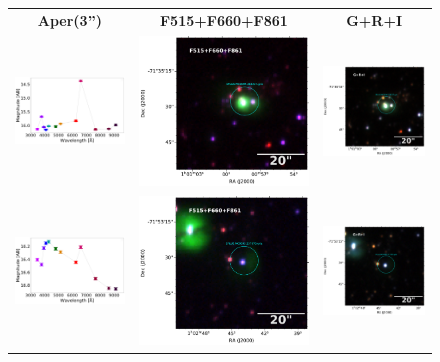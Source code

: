 \documentclass[11pt]{article}
\begin{document}
\newpage
\begin{figure}[!h]
\centering
\begin{tabular}{ccc}
\textbf{Aper(3'')} & \textbf{F515+F660+F861} & \textbf{G+R+I} \\
\includegraphics[width=0.3\linewidth, clip]{photopectrum_splus_MC0094-318227_compat-HIIRegions-smc-match-splus_aper.pdf} & \includegraphics[width=0.3\linewidth, clip]{MC0094/MC0094_F861_318227-RGB-hii.pdf} & \includegraphics[width=0.3\linewidth, clip]{MC0094/MC0094_I_318227-RGB-hii.pdf} \\
\includegraphics[width=0.3\linewidth, clip]{photopectrum_splus_MC0095-257970_compat-HIIRegions-smc-match-splus_aper.pdf} & \includegraphics[width=0.3\linewidth, clip]{MC0095/MC0095_F861_257970-RGB-hii.pdf} & \includegraphics[width=0.3\linewidth, clip]{MC0095/MC0095_I_257970-RGB-hii.pdf} \\

\end{tabular}
\end{figure}
\end{document}

